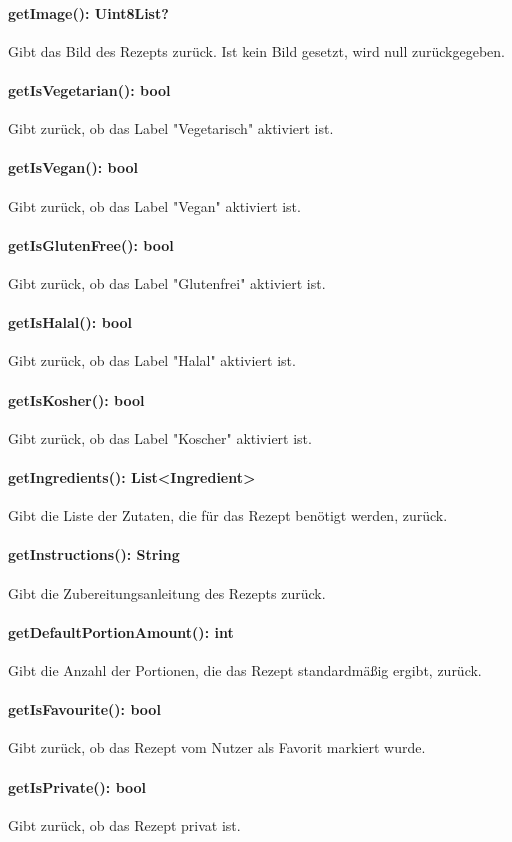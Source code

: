 \documentclass[parskip=full]{scrartcl}
\begin{document}
\paragraph{getImage(): Uint8List?}
Gibt das Bild des Rezepts zurück. Ist kein Bild gesetzt, wird null zurückgegeben.
\paragraph{getIsVegetarian(): bool}
Gibt zurück, ob das Label "Vegetarisch" aktiviert ist.
\paragraph{getIsVegan(): bool}
Gibt zurück, ob das Label "Vegan" aktiviert ist.
\paragraph{getIsGlutenFree(): bool}
Gibt zurück, ob das Label "Glutenfrei" aktiviert ist.
\paragraph{getIsHalal(): bool}
Gibt zurück, ob das Label "Halal" aktiviert ist.
\paragraph{getIsKosher(): bool}
Gibt zurück, ob das Label "Koscher" aktiviert ist.
\paragraph{getIngredients(): List<Ingredient>}
Gibt die Liste der Zutaten, die für das Rezept benötigt werden, zurück.
\paragraph{getInstructions(): String}
Gibt die Zubereitungsanleitung des Rezepts zurück.
\paragraph{getDefaultPortionAmount(): int}
Gibt die Anzahl der Portionen, die das Rezept standardmäßig ergibt, zurück.
\paragraph{getIsFavourite(): bool}
Gibt zurück, ob das Rezept vom Nutzer als Favorit markiert wurde.
\paragraph{getIsPrivate(): bool}
Gibt zurück, ob das Rezept privat ist.
\end{document}
